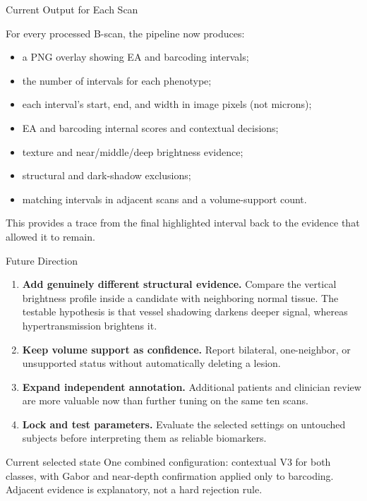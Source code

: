 \documentclass[aspectratio=169]{beamer}
\begin{document}
\begin{frame}{Current Output for Each Scan}

For every processed B-scan, the pipeline now produces:

\begin{itemize}
    \item a PNG overlay showing EA and barcoding intervals;
    \item the number of intervals for each phenotype;
    \item each interval's start, end, and width in image pixels (not microns);
    \item EA and barcoding internal scores and contextual decisions;
    \item texture and near/middle/deep brightness evidence;
    \item structural and dark-shadow exclusions;
    \item matching intervals in adjacent scans and a volume-support count.
\end{itemize}

This provides a trace from the final highlighted interval back to the evidence
that allowed it to remain.

\end{frame}

\begin{frame}{Future Direction}

\begin{enumerate}
    \item \textbf{Add genuinely different structural evidence.} Compare the
    vertical brightness profile inside a candidate with neighboring normal
    tissue. The testable hypothesis is that vessel shadowing darkens deeper
    signal, whereas hypertransmission brightens it.
    \item \textbf{Keep volume support as confidence.} Report bilateral,
    one-neighbor, or unsupported status without automatically deleting a
    lesion.
    \item \textbf{Expand independent annotation.} Additional patients and
    clinician review are more valuable now than further tuning on the same ten
    scans.
    \item \textbf{Lock and test parameters.} Evaluate the selected settings on
    untouched subjects before interpreting them as reliable biomarkers.
\end{enumerate}

\begin{block}{Current selected state}
One combined configuration: contextual V3 for both classes, with Gabor and
near-depth confirmation applied only to barcoding. Adjacent evidence is
explanatory, not a hard rejection rule.
\end{block}

\end{frame}
\end{document}
